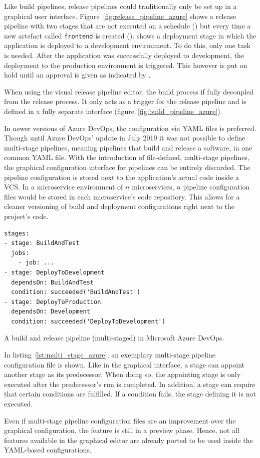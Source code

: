 Like build pipelines, release pipelines could traditionally only be set up in a
graphical user interface. Figure~\ref{fig:release_pipeline_azure} shows a
release pipeline with two stages that are not executed on a schedule
() but every time a new artefact called \texttt{frontend} is created
().  shows a deployment stage in which the application is
deployed to a development environment. To do this, only one task is needed.
After the application was successfully deployed to development, the deployment
to the production environment is triggered. This however is put on hold until
an approval is given as indicated by .

When using the visual release pipeline editor, the build process if fully
decoupled from the release process. It only acts as a trigger for the release
pipeline and is defined in a fully separate interface
(figure~\ref{fig:build_pipeline_azure}).

In newer versions of Azure DevOps, the configuration via YAML files is
preferred. Though until Azure DevOps' update in July 2019 it was not possible
to define multi-stage pipelines, meaning pipelines that build and release a
software, in one common YAML file. With the introduction of file-defined,
multi-stage pipelines, the graphical configuration interface for pipelines can
be entirely discarded. The pipeline configuration is stored next to the
application's actual code inside a \ac{VCS}. In a microservice environment of
$n$ microservices, $n$ pipeline configuration files would be stored in each
microservice's code repository. This allows for a cleaner versioning of build
and deployment configurations right next to the project's code.

\begin{listing}
\begin{verbatim}
stages:
- stage: BuildAndTest
  jobs:
    - job: ...
- stage: DeployToDevelopment
  dependsOn: BuildAndTest
  condition: succeeded('BuildAndTest')
- stage: DeployToProduction
  dependsOn: Development
  condition: succeeded('DeployToDevelopment')
\end{verbatim}
\caption{A build and release pipeline (multi-staged) in Microsoft Azure DevOps.}
\label{lst:multi_stage_azure}
\end{listing}

In listing~\ref{lst:multi_stage_azure}, an exemplary multi-stage pipeline
configuration file is shown. Like in the graphical interface, a stage can
appoint another stage as its predecessor. When doing so, the appointing stage
is only executed after the predecessor's run is completed. In addition, a stage
can require that certain conditions are fulfilled. If a condition fails, the
stage defining it is not executed.

Even if multi-stage pipeline configuration files are an improvement over the
graphical configuration, the feature is still in a preview phase. Hence, not
all features available in the graphical editor are already ported to be used
inside the YAML-based configurations.
